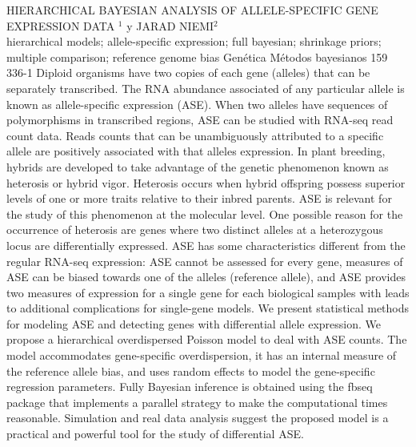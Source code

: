 \A
{HIERARCHICAL BAYESIAN ANALYSIS OF ALLELE-SPECIFIC GENE EXPRESSION DATA}
{$^1$ y JARAD NIEMI$^2$}
{
\\}
{hierarchical models; allele-specific expression; full bayesian; shrinkage priors; multiple comparison; reference genome bias} 
 {Genética} 
 {Métodos bayesianos} 
 {159} 
 {336-1}
{Diploid organisms have two copies of each gene (alleles) that can be separately transcribed. The RNA abundance associated of any particular allele is known as allele-specific expression (ASE). When two alleles have sequences of polymorphisms in transcribed regions, ASE can be studied with RNA-seq read count data. Reads counts that can be unambiguously attributed to a specific allele are positively associated with that alleles expression. In plant breeding, hybrids are developed to take advantage of the genetic phenomenon known as heterosis or hybrid vigor. Heterosis occurs when hybrid offspring possess superior levels of one or more traits relative to their inbred parents. ASE is relevant for the study of this phenomenon at the molecular level. One possible reason for the occurrence of heterosis are genes where two distinct alleles at a heterozygous locus are differentially expressed. ASE has some characteristics different from the regular RNA-seq expression: ASE cannot be assessed for every gene, measures of ASE can be biased towards one of the alleles (reference allele), and ASE provides two measures of expression for a single gene for each biological samples with leads to additional complications for single-gene models. We present statistical methods for modeling ASE and detecting genes with differential allele expression. We propose a hierarchical overdispersed Poisson model to deal with ASE counts. The model accommodates gene-specific overdispersion, it has an internal measure of the reference allele bias, and uses random effects to model the gene-specific regression parameters. Fully Bayesian inference is obtained using the fbseq package that implements a parallel strategy to make the computational times reasonable. Simulation and real data analysis suggest the proposed model is a practical and powerful tool for the study of differential ASE.}
